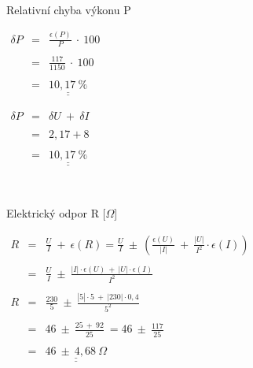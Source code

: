 \documentclass[a4paper,10pt]{article}
\def\doubleunderline#1{\underline{\underline{#1}}}
\begin{document}
\bigskip
\par{~}
\bigskip

\par Relativní chyba výkonu P

\begin{minipage}[t]{.6\textwidth}

$
\begin{array}{lcl}
\delta{P} & = & \frac{\epsilon{(P)}}{P}~\cdot~100 \\
\\
          & = & \frac{117}{1150}~\cdot~100 \\
\\
          & = & \doubleunderline{10,17~\%}
\end{array}
$

\end{minipage}%
\begin{minipage}[t]{.4\textwidth}

$
\begin{array}{lcl}
\delta{P} & = & \delta{U}~+~\delta{I} \\
\\
          & = & 2,17 + 8 \\
\\
          & = & \doubleunderline{10,17~\%}
\end{array}
$

\end{minipage}

\bigskip
\par{~}
\bigskip

\par Elektrický odpor R [$\Omega$]

$
\begin{array}{lcl}
R & = & \frac{U}{I}~+~\epsilon{(R)} = \frac{U}{I}~\pm~(\frac{\epsilon{(U)}}{|I|}~+~\frac{|U|}{I^{2}}{\cdot}\epsilon{(I)}) \\
\\
  & = & \frac{U}{I}~\pm~\frac{|I|{\cdot}\epsilon{(U)}~+~|U|{\cdot}\epsilon{(I)}}{I^{2}} \\
\\
R & = & \frac{230}{5}~\pm~\frac{|5|{\cdot}{5}~+~|230|{\cdot}{0,4}}{5^{2}} \\
\\
  & = & 46~\pm~\frac{25~+~92}{25}~=46~\pm~\frac{117}{25} \\
\\
  & = & \doubleunderline{46~\pm~4,68~\Omega}
\end{array}
$
\end{document}
